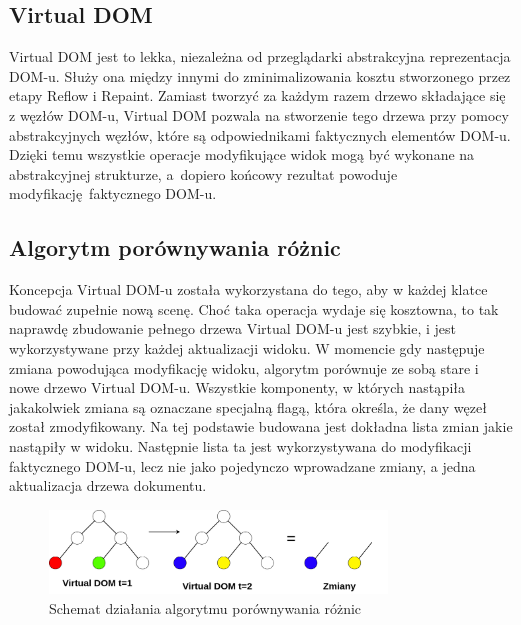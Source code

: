\subsection{Virtual DOM}
Virtual DOM jest to lekka, niezależna od przeglądarki abstrakcyjna reprezentacja DOM-u. Służy ona między innymi do zminimalizowania kosztu stworzonego przez etapy Reflow i Repaint. Zamiast tworzyć za każdym razem drzewo składające się z węzłów DOM-u, Virtual DOM pozwala na stworzenie tego drzewa przy pomocy abstrakcyjnych węzłów, które są odpowiednikami faktycznych elementów DOM-u. Dzięki temu wszystkie operacje modyfikujące widok mogą być wykonane na abstrakcyjnej strukturze, a~dopiero końcowy rezultat powoduje modyfikację faktycznego DOM-u.

\subsection{Algorytm porównywania różnic}
Koncepcja Virtual DOM-u została wykorzystana do tego, aby w każdej klatce budować zupełnie nową scenę. Choć taka operacja wydaje się kosztowna, to tak naprawdę zbudowanie pełnego drzewa Virtual DOM-u jest szybkie, i jest wykorzystywane przy każdej aktualizacji widoku. W momencie gdy następuje zmiana powodująca modyfikację widoku, algorytm porównuje ze sobą stare i nowe drzewo Virtual DOM-u. Wszystkie komponenty, w których nastąpiła jakakolwiek zmiana są oznaczane specjalną flagą, która określa, że dany węzeł został zmodyfikowany. Na tej podstawie budowana jest dokładna lista zmian jakie nastąpiły w widoku. Następnie lista ta jest wykorzystywana do modyfikacji faktycznego DOM-u, lecz nie jako pojedynczo wprowadzane zmiany, a jedna aktualizacja drzewa dokumentu. 

\begin{figure}[h]
	\centering
	\includegraphics[width=0.8\textwidth]{images/diff_algorithm}
	\caption{Schemat działania algorytmu  porównywania różnic}
	\label{fig:diffAlgorithm}
\end{figure}

